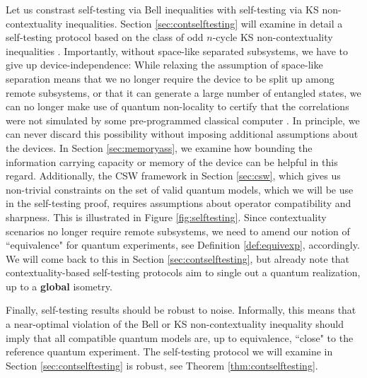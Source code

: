 Let us constrast self-testing via Bell inequalities with self-testing via KS non-contextuality inequalities. Section \ref{sec:contselftesting} will examine in detail a self-testing protocol based on the class of odd $n$-cycle KS non-contextuality inequalities \cite{Bharti2019}. Importantly, without space-like separated subsystems, we have to give up device-independence: While relaxing the assumption of space-like separation means that we no longer require the device to be split up among remote subsystems, or that it can generate a large number of entangled states, we can no longer make use of quantum non-locality to certify that the correlations were not simulated by some pre-programmed classical computer \cite{Supic2020}. In principle, we can never discard this possibility without imposing additional assumptions about the devices. In Section \ref{sec:memoryass}, we examine how bounding the information carrying capacity or memory of the device can be helpful in this regard. Additionally, the CSW framework in Section \ref{sec:csw}, which gives us non-trivial constraints on the set of valid quantum models, which we will be use in the self-testing proof, requires assumptions about operator compatibility and sharpness. This is illustrated in Figure \ref{fig:selftesting}. Since contextuality scenarios no longer require remote subsystems, we need to amend our notion of ``equivalence" for quantum experiments, see Definition \ref{def:equivexp}, accordingly. We will come back to this in Section \ref{sec:contselftesting}, but already note that contextuality-based self-testing protocols aim to single out a quantum realization, up to a \textbf{global} isometry.

Finally, self-testing results should be robust to noise. Informally, this means that a near-optimal violation of the Bell or KS non-contextuality inequality should imply that all compatible quantum models are, up to equivalence, ``close" to the reference quantum experiment. The self-testing protocol we will examine in Section \ref{sec:contselftesting} is robust, see Theorem \ref{thm:contselftesting}.

